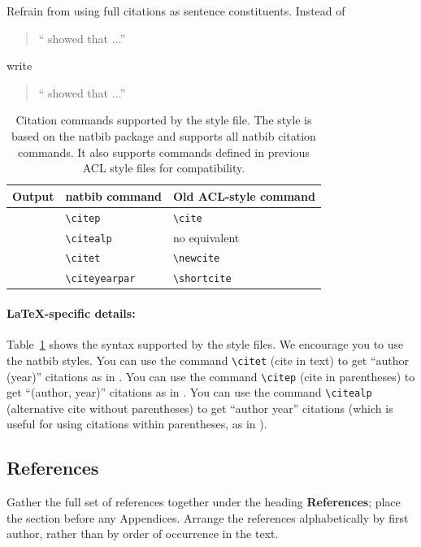 \documentclass[11pt,a4paper]{article}
\begin{document}
Refrain from using full citations as sentence constituents.
Instead of
\begin{quote}
  ``\citep{Gusfield:97} showed that ...''
\end{quote}
write
\begin{quote}
``\citet{Gusfield:97} showed that ...''
\end{quote}

\begin{table}
\centering
\begin{tabular}{lll}
\hline
\textbf{Output} & \textbf{natbib command} & \textbf{Old ACL-style command}\\
\hline
\citep{Gusfield:97} & \small\verb|\citep| & \small\verb|\cite| \\
\citealp{Gusfield:97} & \small\verb|\citealp| & no equivalent \\
\citet{Gusfield:97} & \small\verb|\citet| & \small\verb|\newcite| \\
\citeyearpar{Gusfield:97} & \small\verb|\citeyearpar| & \small\verb|\shortcite| \\
\hline
\end{tabular}
\caption{\label{citation-guide}
Citation commands supported by the style file.
The style is based on the natbib package and supports all natbib citation commands.
It also supports commands defined in previous ACL style files for compatibility.
}
\end{table}

\paragraph{\LaTeX-specific details:}
Table~\ref{citation-guide} shows the syntax supported by the style files.
We encourage you to use the natbib styles.
You can use the command {\small\verb|\citet|} (cite in text) to get ``author (year)'' citations as in \citet{Gusfield:97}.
You can use the command {\small\verb|\citep|} (cite in parentheses) to get ``(author, year)'' citations as in \citep{Gusfield:97}.
You can use the command {\small\verb|\citealp|} (alternative cite without  parentheses) to get ``author year'' citations (which is useful for  using citations within parentheses, as in \citealp{Gusfield:97}).


\subsection{References}
Gather the full set of references together under the heading \textbf{References}; place the section before any Appendices. 
Arrange the references alphabetically by first author, rather than by order of occurrence in the text.
\end{document}
